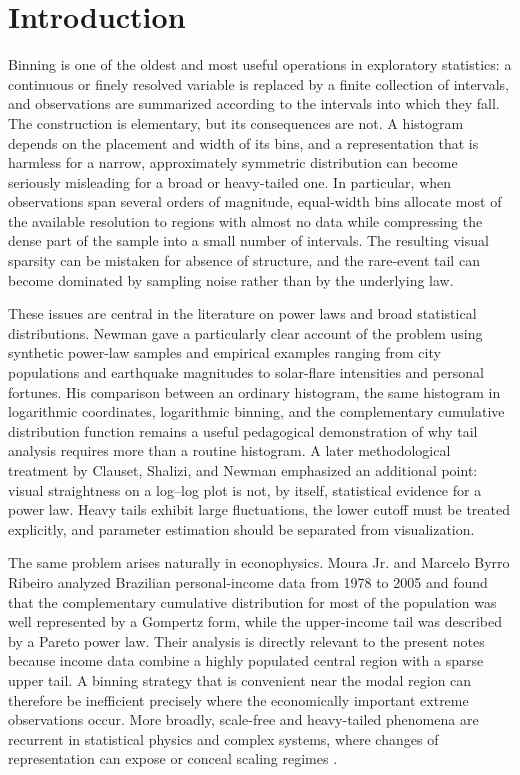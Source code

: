 \section{Introduction}

Binning is one of the oldest and most useful operations in exploratory statistics: a continuous or finely resolved variable is replaced by a finite collection of intervals, and observations are summarized according to the intervals into which they fall. The construction is elementary, but its consequences are not. A histogram depends on the placement and width of its bins, and a representation that is harmless for a narrow, approximately symmetric distribution can become seriously misleading for a broad or heavy-tailed one. In particular, when observations span several orders of magnitude, equal-width bins allocate most of the available resolution to regions with almost no data while compressing the dense part of the sample into a small number of intervals. The resulting visual sparsity can be mistaken for absence of structure, and the rare-event tail can become dominated by sampling noise rather than by the underlying law.

These issues are central in the literature on power laws and broad statistical distributions. Newman \cite{Newman2005} gave a particularly clear account of the problem using synthetic power-law samples and empirical examples ranging from city populations and earthquake magnitudes to solar-flare intensities and personal fortunes. His comparison between an ordinary histogram, the same histogram in logarithmic coordinates, logarithmic binning, and the complementary cumulative distribution function remains a useful pedagogical demonstration of why tail analysis requires more than a routine histogram. A later methodological treatment by Clauset, Shalizi, and Newman \cite{ClausetShaliziNewman2009} emphasized an additional point: visual straightness on a log--log plot is not, by itself, statistical evidence for a power law. Heavy tails exhibit large fluctuations, the lower cutoff must be treated explicitly, and parameter estimation should be separated from visualization.

The same problem arises naturally in econophysics. Moura Jr. and Marcelo Byrro Ribeiro \cite{MouraRibeiro2009} analyzed Brazilian personal-income data from 1978 to 2005 and found that the complementary cumulative distribution for most of the population was well represented by a Gompertz form, while the upper-income tail was described by a Pareto power law. Their analysis is directly relevant to the present notes because income data combine a highly populated central region with a sparse upper tail. A binning strategy that is convenient near the modal region can therefore be inefficient precisely where the economically important extreme observations occur. More broadly, scale-free and heavy-tailed phenomena are recurrent in statistical physics and complex systems, where changes of representation can expose or conceal scaling regimes \cite{Sornette2006}.


